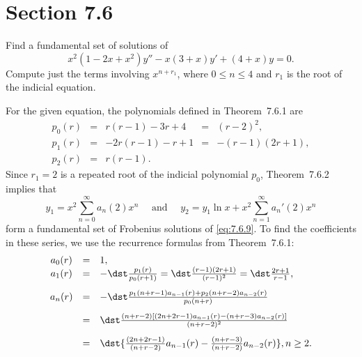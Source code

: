 \section*{Section 7.6}
\setcounter{chapter}{7}
\setcounter{section}{6}

\setcounter{example}{0}
\setcounter{equation}{8}
\begin{example}
  \label{example:7.6.1} \rm Find a fundamental set of solutions of
  \begin{equation}
    \label{eq:7.6.9}x^{2}(1-2x+x^{2})y''-x(3+x)y'+(4+x)y=0.
  \end{equation}
  Compute just the terms involving $x^{n+r_{1}}$, where $0\le n\le4$ and $r_{1}$ is the root of the
  indicial equation.
\end{example}
\setcounter{equation}{9}
\begin{examplesolution}
\solution For the given equation, the polynomials defined in Theorem~7.6.1 are
\[
  \begin{array}{lllll}
    p_{0}(r) & = & r(r-1)-3r+4  & = & (r-2)^{2},    \\[5pt]
    p_{1}(r) & = & -2r(r-1)-r+1 & = & -(r-1)(2r+1), \\[5pt]
    p_{2}(r) & = & r(r-1).
  \end{array}
\]
Since $r_{1}=2$ is a repeated root of the indicial polynomial $p_{0}$, Theorem~7.6.2
implies that
\begin{equation}
  \label{eq:7.6.10}y_{1}=x^{2}\sum_{n=0}^{\infty}a_{n}(2)x^{n}\quad\mbox{ and }\quad y_{2}=y_{1}\ln x+x^{2}\sum_{n=1}^{\infty}a_{n}'(2)x^{n}
\end{equation}
form a fundamental set of Frobenius solutions of \eqref{eq:7.6.9}. To find the coefficients in these
series, we use the recurrence formulas from Theorem~7.6.1:
\begin{equation}
  \label{eq:7.6.11}
  \begin{array}{ccl}
    a_{0}(r) & = & 1,                                                                                          \\
    a_{1}(r) & = & -\dst\frac{p_{1}(r)}{p_{0}(r+1)} =\dst\frac{(r-1)(2r+1)}{(r-1)^{2}} =\dst\frac{2r+1}{r-1}, \\[10pt]
    a_{n}(r) & = & -\dst\frac{p_{1}(n+r-1)a_{n-1}(r)+p_{2}(n+r-2)a_{n-2}(r)}{p_{0}(n+r)}                       \\[10pt]
             & = & \dst\frac{(n+r-2)\left[(2n+2r-1)a_{n-1}(r) -(n+r-3)a_{n-2}(r)\right]}{(n+r-2)^{2}}          \\[10pt]
             & = & \dst{\frac{(2n+2r-1)}{(n+r-2)}a_{n-1}(r)- \frac{(n+r-3)}{(n+r-2)}a_{n-2}(r)},n\ge2.

\end{array}
\end{equation}
\end{examplesolution}
